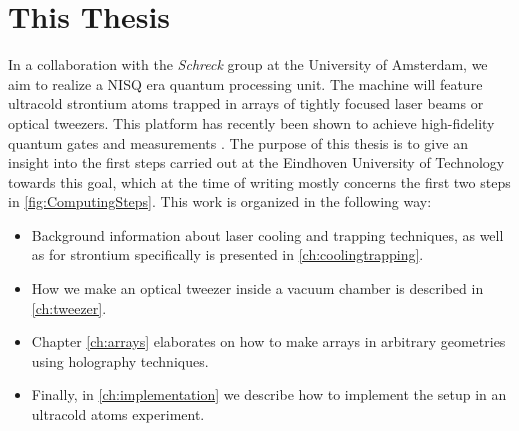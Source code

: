 \section{This Thesis}

In a collaboration with the \textit{Schreck} group at the University of Amsterdam, we aim to realize a \ac{NISQ} era quantum processing unit. The machine will feature ultracold strontium atoms trapped in arrays of tightly focused laser beams or optical tweezers. This platform has recently been shown to achieve high-fidelity quantum gates and measurements \cite{Madjarov2020}. The purpose of this thesis is to give an insight into the first steps carried out at the Eindhoven University of Technology towards this goal, which at the time of writing mostly concerns the first two steps in \cref{fig:ComputingSteps}. This work is organized in the following way:

\begin{itemize}
	\setlength\itemsep{0em}
	\item Background information about laser cooling and trapping techniques, as well as for strontium specifically is presented in \cref{ch:coolingtrapping}. 

	\item How we make an optical tweezer inside a vacuum chamber is described in \cref{ch:tweezer}. 

	\item Chapter \ref{ch:arrays} elaborates on how to make arrays in arbitrary geometries using holography techniques.

	\item Finally, in \cref{ch:implementation} we describe how to implement the setup in an ultracold atoms experiment.
\end{itemize}










